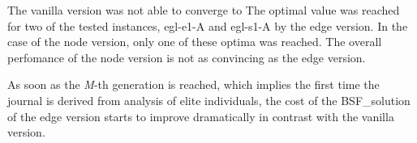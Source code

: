 \documentclass[twoside]{ctuthesis}
\theoremstyle{plain}
\theoremstyle{definition}
\theoremstyle{note}
\begin{document}
The vanilla version was not able to converge to 
The optimal value was reached for two of the tested instances, egl-e1-A and egl-s1-A by the edge version. In the case of the node version, only one of these optima was reached. The overall perfomance of the node version is not as convincing as the edge version. 
 

As soon as the \emph{M}-th generation is reached, which implies the first time the journal is derived from analysis of elite individuals, the cost of the BSF\_solution of the edge version starts to improve dramatically in contrast with the vanilla version.






%
%
\end{document}
